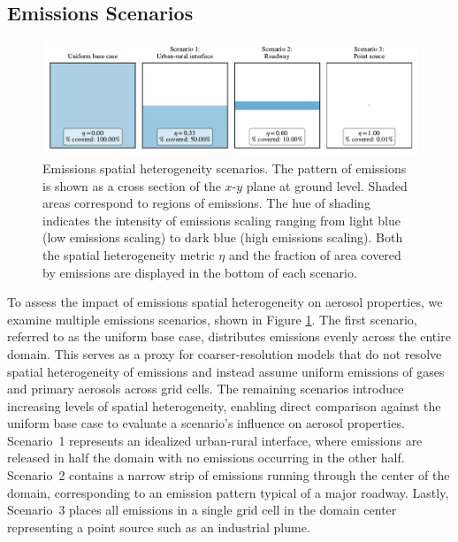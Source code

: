 \documentclass[journal abbreviation, manuscript]{copernicus}
\begin{document}
\subsection{Emissions Scenarios}

\begin{figure}[!t]
	\centering
	\includegraphics[]{figures/SH-scenarios.pdf}
	\caption{Emissions spatial heterogeneity scenarios. The
          pattern of emissions is shown as a cross section of the
          $x$-$y$ plane at ground level. Shaded areas correspond to
          regions of emissions. The hue of shading indicates the
          intensity of emissions scaling ranging from light blue (low
          emissions scaling) to dark blue (high emissions
          scaling). Both the spatial heterogeneity metric $\eta$ and
          the fraction of area covered by emissions are displayed in
          the bottom of each scenario.}
	\label{fig:sh-scenarios}
\end{figure} 

To assess the impact of emissions spatial heterogeneity on aerosol
properties, we examine multiple emissions scenarios, shown in Figure
\ref{fig:sh-scenarios}. The first scenario, referred to as the uniform
base case, distributes emissions evenly across the entire domain. This
serves as a proxy for coarser-resolution models that do not resolve
spatial heterogeneity of emissions and instead assume uniform
emissions of gases and primary aerosols across grid cells. The
remaining scenarios introduce increasing levels of spatial
heterogeneity, enabling direct comparison against the uniform base
case to evaluate a scenario's influence on aerosol properties. Scenario~1
represents an idealized urban-rural interface, where emissions are
released in half the domain with no emissions occurring in the other
half. Scenario~2 contains a narrow strip of emissions running through
the center of the domain, corresponding to an emission pattern typical
of a major roadway. Lastly, Scenario~3 places all emissions in a
single grid cell in the domain center representing a point source such
as an industrial plume.
\end{document}
